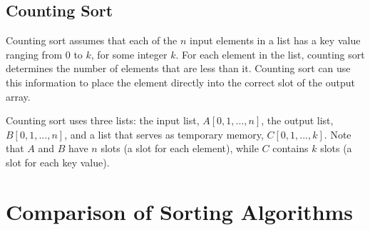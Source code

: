 \documentclass[twoside,12pt,a4paper,english]{book}
\theoremstyle{definition}
\theoremstyle{problemstyle}
\begin{document}
\subsection{Counting Sort}

Counting sort assumes that each of the $n$ input elements in a list has a key value ranging from $0$ to $k$, for some integer $k$. For each element in the list, counting sort determines the number of elements that are less than it. Counting sort can use this information to place the element directly into the correct slot of the output array.

Counting sort uses three lists: the input list, \texttt{$A[0,1,...,n]$}, the output list, \texttt{$B[0,1,...,n]$}, and a list that serves as temporary memory, \texttt{$C[0,1,...,k]$}. Note that $A$ and $B$ have $n$ slots (a slot for each element), while $C$ contains $k$ slots (a slot for each key value).

\section{Comparison of Sorting Algorithms}
\end{document}
